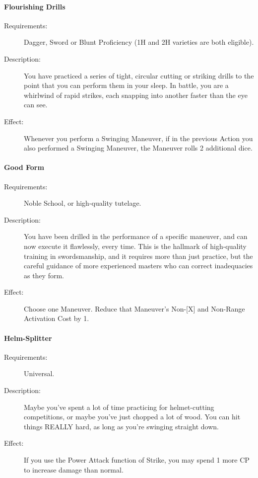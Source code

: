 \documentclass[oneside,11pt,english]{book}
\begin{document}
\paragraph{Flourishing Drills}\label{talent:Flourishing Drills}
\begin{description}
\item [Requirements:] Dagger, Sword or Blunt Proficiency (1H and 2H varieties are both eligible). 
\item [Description:] You have practiced a series of tight, circular cutting or striking drills to the point that you can perform them in your sleep. In battle, you are a whirlwind of rapid strikes, each snapping into another faster than the eye can see. 
\item [Effect:] Whenever you perform a Swinging Maneuver, if in the previous Action you also performed a Swinging Maneuver, the Maneuver rolls 2 additional dice. 
\end{description}

\paragraph{\label{talent:Good Form}Good Form}
\begin{description}
\item [Requirements:] Noble School, or high-quality tutelage. 
\item [Description:] You have been drilled in the performance of a specific maneuver, and can now execute it 
  flawlessly, every time. This is the hallmark of high-quality training in swordsmanship, and it requires 
  more than just practice, but the careful guidance of more experienced masters who can correct 
  inadequacies as they form. 
\item [Effect:] Choose one Maneuver. Reduce that Maneuver’s Non-[X] and Non-Range Activation Cost by 1. 
  
\end{description}
\paragraph{\label{talent:Helm-Splitter}Helm-Splitter}
\begin{description}
\item [Requirements:] Universal. 
\item [Description:] Maybe you've spent a lot of time practicing for helmet-cutting competitions, or maybe 
  you've just chopped a lot of wood. You can hit things REALLY hard, as long as you’re swinging straight 
  down. 
\item [Effect:] If you use the Power Attack function of Strike, you may spend 1 more CP to increase damage 
  than normal. 
  
\end{description}
\end{document}
